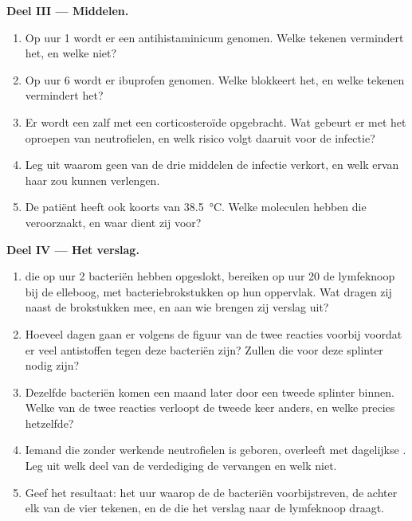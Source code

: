 \begin{problem}
\medskip
\noindent\textbf{Deel III --- Middelen.}
\begin{enumerate}[resume]
  \item Op uur 1 wordt er een antihistaminicum genomen. Welke tekenen
        vermindert het, en welke niet?
  \item Op uur 6 wordt er ibuprofen genomen. Welke  blokkeert het,
        en welke tekenen vermindert het?
  \item Er wordt een zalf met een corticosteroïde opgebracht. Wat gebeurt
        er met het oproepen van neutrofielen, en welk risico volgt daaruit
        voor de infectie?
  \item Leg uit waarom geen van de drie middelen de infectie verkort, en
        welk ervan haar zou kunnen verlengen.
  \item De patiënt heeft ook koorts van \qty{38.5}{\celsius}. Welke
        moleculen hebben die veroorzaakt, en waar dient zij voor?
\end{enumerate}

\medskip
\noindent\textbf{Deel IV --- Het verslag.}
\begin{enumerate}[resume]
  \item {} die op uur 2 bacteriën hebben opgeslokt,
        bereiken op uur 20 de lymfeknoop bij de elleboog, met
        bacteriebrokstukken op hun oppervlak. Wat dragen zij naast de
        brokstukken mee, en aan wie brengen zij verslag uit?
  \item Hoeveel dagen gaan er volgens de figuur van de twee reacties
        voorbij voordat er veel antistoffen tegen deze bacteriën zijn?
        Zullen die voor deze splinter nodig zijn?
  \item Dezelfde bacteriën komen een maand later door een tweede splinter
        binnen. Welke van de twee reacties verloopt de tweede keer anders,
        en welke precies hetzelfde?
  \item Iemand die zonder werkende neutrofielen is geboren, overleeft met
        dagelijkse . Leg uit welk deel van de verdediging de
         vervangen en welk niet.
  \item Geef het resultaat: het uur waarop de  de bacteriën
        voorbijstreven, de  achter elk van de vier tekenen, en de
         die het verslag naar de lymfeknoop draagt.
\end{enumerate}
\end{problem}
